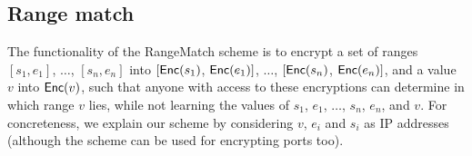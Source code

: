

%
%
%
%
%
%
%
%
%
%
%
%

\subsection{Range match } \label{sec:range}






%
The functionality of the RangeMatch scheme is to encrypt a set of ranges $[s_1, e_1]$, $\dots$, $[s_n, e_n]$ into  $[\mathsf{Enc}(s_1)$, $\mathsf{Enc}(e_1)]$, $\dots$, $[\mathsf{Enc}(s_n)$,  $\mathsf{Enc}(e_n)]$, and a value $v$ into $\mathsf{Enc}(v)$, such that anyone with access to these encryptions can determine in which range $v$ lies, while not learning the values of $s_1$, $e_1$, $\dots$, $s_n$, $e_n$, and $v$. 
For concreteness, we explain our scheme by considering $v$, $e_i$ and $s_i$ as IP addresses (although the scheme can be used for encrypting ports too).

